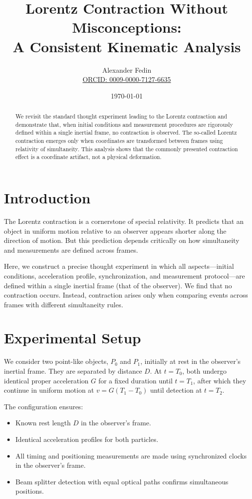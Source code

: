\documentclass[11pt]{article}
\title{\textbf{Lorentz Contraction Without Misconceptions:\\A Consistent Kinematic Analysis}}
\author{Alexander Fedin\\\href{https://orcid.org/0009-0000-7127-6635}{ORCID: 0009-0000-7127-6635}}
\date{\today}
\begin{document}
\maketitle

\begin{abstract}
We revisit the standard thought experiment leading to the Lorentz contraction and demonstrate that, when initial conditions and measurement procedures are rigorously defined within a single inertial frame, no contraction is observed. The so-called Lorentz contraction emerges only when coordinates are transformed between frames using relativity of simultaneity. This analysis shows that the commonly presented contraction effect is a coordinate artifact, not a physical deformation.
\end{abstract}

\section{Introduction}

The Lorentz contraction is a cornerstone of special relativity. It predicts that an object in uniform motion relative to an observer appears shorter along the direction of motion. But this prediction depends critically on how simultaneity and measurements are defined across frames.

Here, we construct a precise thought experiment in which all aspects—initial conditions, acceleration profile, synchronization, and measurement protocol—are defined within a single inertial frame (that of the observer). We find that no contraction occurs. Instead, contraction arises only when comparing events across frames with different simultaneity rules.

\section{Experimental Setup}

We consider two point-like objects, $P_0$ and $P_1$, initially at rest in the observer's inertial frame. They are separated by distance $D$. At $t = T_0$, both undergo identical proper acceleration $G$ for a fixed duration until $t = T_1$, after which they continue in uniform motion at $v = G(T_1 - T_0)$ until detection at $t = T_2$.

The configuration ensures:

\begin{itemize}
    \item Known rest length $D$ in the observer's frame.
    \item Identical acceleration profiles for both particles.
    \item All timing and positioning measurements are made using synchronized clocks in the observer's frame.
    \item Beam splitter detection with equal optical paths confirms simultaneous positions.
\end{itemize}
\end{document}
